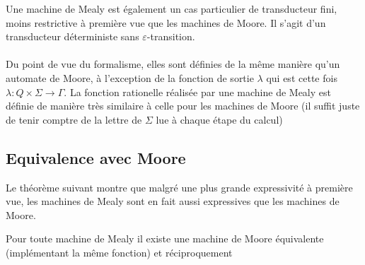 \documentclass{scrartcl}
\begin{document}
\begin{flushleft}
Une machine de Mealy est également un cas particulier de transducteur fini, moins restrictive à première vue que les machines de Moore.
Il s'agit d'un transducteur déterministe sans $\varepsilon$-transition.
\\~\\
Du point de vue du formalisme, elles sont définies de la même manière qu'un automate de Moore, à l'exception de la fonction de sortie
$\lambda$ qui est cette fois $\lambda : Q \times \Sigma \rightarrow \Gamma$. La fonction rationelle réalisée par une machine de Mealy
est définie de manière très similaire à celle pour les machines de Moore (il suffit juste de tenir comptre de la lettre de $\Sigma$ lue à chaque
étape du calcul)


\subsection{Equivalence avec Moore}

Le théorème suivant montre que malgré une plus grande expressivité à première vue, les machines de Mealy sont en fait aussi expressives que les machines
de Moore.

\begin{theorem}
    Pour toute machine de Mealy il existe une machine de Moore équivalente (implémentant la même fonction) et réciproquement
\end{theorem}


\end{flushleft}
\end{document}
